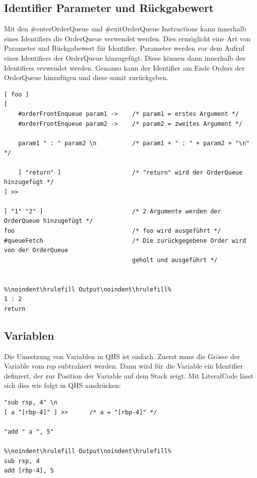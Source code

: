 \subsection{Identifier Parameter und Rückgabewert}
Mit den \#enterOrderQueue und \#exitOrderQueue Instructions kann innerhalb eines Identifiers die OrderQueue verwendet werden. Dies ermöglicht eine Art von Parameter und Rückgabewert für Identifier.
Parameter werden vor dem Aufruf eines Identifiers der OrderQueue hinzugefügt. Diese können dann innerhalb des Identifiers verwendet werden.
Genauso kann der Identifier am Ende Orders der OrderQueue hinzufügen und diese somit zurückgeben.

\begin{lstlisting}[language=QHS, caption=Verwendung von Parametern und Rückgabewert eines Identifiers]
[ foo ]
[
    #orderFrontEnqueue param1 ->    /* param1 = erstes Argument */
    #orderFrontEnqueue param2 ->    /* param2 = zweites Argument */

    param1 " : " param2 \n          /* param1 + " : " + param2 + "\n" */

    [ "return" ]                    /* "return" wird der OrderQueue hinzugefügt */
] >>

[ "1" "2" ]                         /* 2 Argumente werden der OrderQueue hinzugefügt */
foo                                 /* foo wird ausgeführt */
#queueFetch                         /* Die zurückgegebene Order wird von der OrderQueue
                                    geholt und ausgeführt */


%\noindent\hrulefill Output\noindent\hrulefill%
1 : 2
return
\end{lstlisting}


\subsection{Variablen} \label{sec:qhs-vars}
Die Umsetzung von Variablen in QHS ist einfach. 
Zuerst muss die Grösse der Variable vom rsp subtrahiert werden.
Dann wird für die Variable ein Identifier definiert, der zur Position der Variable auf dem Stack zeigt.
Mit LiteralCode lässt sich dies wie folgt in QHS ausdrücken:

\begin{lstlisting}[language=QHS, caption=Definition einer Variable mit LiteralCode]
"sub rsp, 4" \n
[ a "[rbp-4]" ] >>      /* a = "[rbp-4]" */

"add " a ", 5"

%\noindent\hrulefill Output\noindent\hrulefill%
sub rsp, 4
add [rbp-4], 5
\end{lstlisting}

